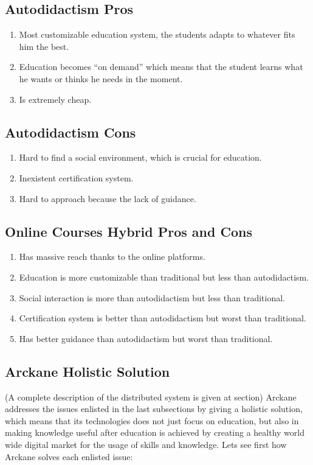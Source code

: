  \subsection{Autodidactism Pros}
\begin{enumerate}
\item Most customizable education system, the students adapts to whatever fits him the best.
\item Education becomes “on demand” which means that the student learns what he wants or thinks he needs in the moment.
\item Is extremely cheap.
\end{enumerate} 

\subsection{Autodidactism Cons}
\begin{enumerate}
\item Hard to find a social environment, which is crucial for education.
\item Inexistent certification system.
\item Hard to approach because the lack of guidance.
\end{enumerate} 

\subsection{Online Courses Hybrid Pros and Cons}
\begin{enumerate}
\item Has massive reach thanks to the online platforms.
\item Education is more customizable than traditional but less than autodidactism.
\item Social interaction is more than autodidactism but less than traditional.
\item Certification system is better than autodidactism but worst than traditional.
\item Has better guidance than autodidactism but worst than traditional. 
\end{enumerate} 


\subsection{Arckane Holistic Solution}

(A complete description of the distributed system is given at section) Arckane addresses the issues enlisted in the last subsections by giving a holistic solution, which means that its technologies does not just focus on education, but also in making knowledge useful after education is achieved by creating a healthy world wide digital market for the usage of skills and knowledge. Lets see first how Arckane solves each enlisted issue:

